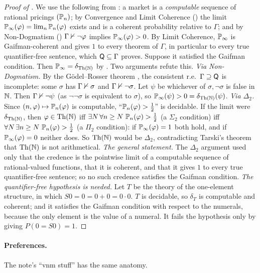 \begin{proof}[Proof of ]
We use the following from \citet{garrabrant2016logical}: a market is a \emph{computable} sequence of rational pricings $(\mathbb{P}_n)$; by Convergence and Limit Coherence (\citealt[Thms 4.1.1, 4.1.2]{garrabrant2016logical}) the limit $\mathbb{P}_\infty(\varphi)=\lim_n\mathbb{P}_n(\varphi)$ exists and is a coherent probability relative to $\Gamma$; and by Non-Dogmatism (\citealt[Thm 4.6.2]{garrabrant2016logical}) $\Gamma\nvdash\neg\varphi$ implies $\mathbb{P}_\infty(\varphi)>0$.
By Limit Coherence, $\mathbb{P}_\infty$ is Gaifman-coherent and gives $1$ to every theorem of $\Gamma$, in particular to every true quantifier-free sentence, which $\mathsf{Q}\subseteq\Gamma$ proves. Suppose it satisfied the Gaifman condition. Then $\mathbb{P}_\infty=\delta_{\mathrm{Th}(\mathbb{N})}$ by . Two arguments refute this.
\emph{Via Non-Dogmatism.} By the G\"odel--Rosser theorem \citep{godel1931formal,rosser1936extensions}, the consistent r.e.\ $\Gamma\supseteq\mathsf{Q}$ is incomplete: some $\sigma$ has $\Gamma\nvdash\sigma$ and $\Gamma\nvdash\neg\sigma$. Let $\psi$ be whichever of $\sigma,\neg\sigma$ is false in $\mathbb{N}$. Then $\Gamma\nvdash\neg\psi$ (as $\neg\neg\sigma$ is equivalent to $\sigma$), so $\mathbb{P}_\infty(\psi)>0=\delta_{\mathrm{Th}(\mathbb{N})}(\psi)$.
\emph{Via $\Delta_2$.} Since $(n,\varphi)\mapsto\mathbb{P}_n(\varphi)$ is computable, ``$\mathbb{P}_n(\varphi)>\frac12$'' is decidable. If the limit were $\delta_{\mathrm{Th}(\mathbb{N})}$, then $\varphi\in\mathrm{Th}(\mathbb{N})$ iff $\exists N\,\forall n\ge N\ \Prob_n(\varphi)>\frac12$ (a $\Sigma_2$ condition) iff $\forall N\,\exists n\ge N\ \Prob_n(\varphi)>\frac12$ (a $\Pi_2$ condition): if $\mathbb{P}_\infty(\varphi)=1$ both hold, and if $\mathbb{P}_\infty(\varphi)=0$ neither does. So $\mathrm{Th}(\mathbb{N})$ would be $\Delta_2$, contradicting Tarski's theorem that $\mathrm{Th}(\mathbb{N})$ is not arithmetical.
\emph{The general statement.} The $\Delta_2$ argument used only that the credence is the pointwise limit of a computable sequence of rational-valued functions, that it is coherent, and that it gives $1$ to every true quantifier-free sentence; so no such credence satisfies the Gaifman condition.
\emph{The quantifier-free hypothesis is needed.} Let $T$ be the theory of the one-element structure, in which $S0=0=0+0=0\cdot0$. $T$ is decidable, so $\delta_T$ is computable and coherent; and it satisfies the Gaifman condition with respect to the numerals, because the only element is the value of a numeral. It fails the hypothesis only by giving $P(0=S0)=1$.
\end{proof}

\paragraph{Preferences.} The note's ``vnm stuff'' has the same anatomy.

